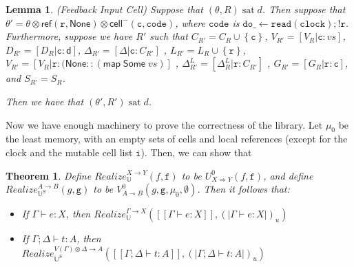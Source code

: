 \documentclass[nocopyrightspace,preprint]{sigplanconf}
\newcommand{\ultrametric}{\mathbb{U}}
\newcommand{\setof}[1]{\left\{{#1}\right\}}
\newcommand{\term}[1]{\ensuremath{\mathtt{{#1}}}}
\newcommand{\To}{\Rightarrow}
\newcommand{\interp}[1]{[\![{#1}]\!]}
\newcommand{\interpu}[1]{(\!|{#1}|\!)_u}
\newcommand{\realize}[5]{\mathit{Realize}_{#1}^{#2 \to #3}({#4}, {#5})}
\newcommand{\lolli}{\multimap}
\newcommand{\None}{\mathsf{None}}
\newcommand{\cellminus}[2]{\mathsf{cell}^{-}({#1}, {#2})}
\newcommand{\judgeu}[3]{{#1} \vdash {#2} : {#3}}
\newcommand{\judgek}[4][\Gamma]{{#1};{#2} \vdash {#3} : {#4}}
\newcommand{\D}{\mathsf{d}}
\newcommand{\satisfy}[2]{{#1}\;\mathrm{sat}\;{#2}}
\newtheorem{lemma}{Lemma}
\newtheorem{theorem}{Theorem}
\begin{document}
\begin{lemma}{(Feedback Input Cell)}
Suppose that $\satisfy{(\theta, R)}{d}$. Then suppose that $\theta' =
\theta \otimes \mathsf{ref}(\term{r,\None}) \otimes \cellminus{\term{c}}{\term{code}}$, where
\term{code} is $\term{do \_ \leftarrow read(clock); !r}$. Furthermore, suppose we
have $R'$ such that 
 $C_{R'} = C_R \cup \setof{\term{c}}$,
 $V_{R'} = [V_R|\term{c}:vs]$,
 $D_{R'} = [D_R|\term{c}:\D]$,
 $\Delta_{R'} = [\Delta|\term{c}:C_{R'}]$ ,
 $L_{R'} = L_R \cup \setof{\term{r}}$,
 $V_{R'} = [V_R|\term{r}:(\None :: (\mathsf{map\;Some}\;vs)]$ ,
 $\Delta^L_{R'} = [\Delta^L_R|\term{r}:C_{R'}]$ ,
 $G_{R'} = [G_R|\term{r}:\term{c}]$, and
 $S_{R'} = S_R$.

Then we have that $\satisfy{(\theta', R')}{d}$. 
\end{lemma}
\noindent Now we have enough machinery to prove the correctness of the library.
Let $\mu_0$ be the least memory, with an empty sets of cells and local
references (except for the clock and the mutable cell list \term{i}). Then,
we can show that
\begin{theorem}
Define $\realize{\ultrametric}{X}{Y}{f}{\term{f}}$ to be $U^0_{X \To
  Y}(f, \term{f})$, and define
$\realize{\ultrametric^S}{A}{B}{g}{\term{g}}$ to be $V^0_{A \lolli
  B}(g, \term{g}, \mu_0, \emptyset)$. 
Then it follows that:
\begin{itemize}
\item If $\judgeu{\Gamma}{e}{X}$, then $\realize{\ultrametric}{\Gamma}{X}{\interp{\judgeu{\Gamma}{e}{X}}}{\interpu{\judgeu{\Gamma}{e}{X}}}$
\item If $\judgek{\Delta}{t}{A}$, then \\
$\realize{\ultrametric^S}{V(\Gamma) \otimes \Delta}{A}{\interp{\judgek{\Delta}{t}{A}}}{\interpu{\judgek{\Delta}{t}{A}}}$
\end{itemize}
\end{theorem}
\end{document}
